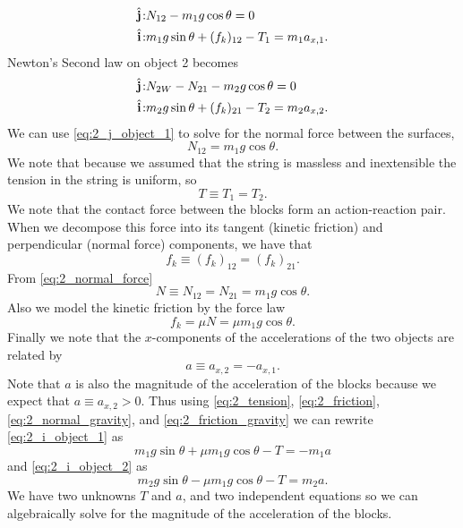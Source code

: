 \documentclass{esg8012exam}
\providecommand{\uvec}[1]{{\hat{\bf{#1}}}}
\begin{document}
\begin{solution}
  \begin{align}
    \uvec j\!: & N_{12} - m_1 g \cos\theta = 0 \label{eq:2_j_object_1} \\
    \uvec i\!: & m_1 g \sin\theta + (f_k)_{12} - T_1 = m_1 a_{x,1}. \label{eq:2_i_object_1}
  \end{align}
  Newton's Second law on object 2 becomes
  \begin{align}
    \uvec j\!: & N_{2W} - N_{21} - m_2 g \cos\theta = 0 \label{eq:2_j_object_2} \\
    \uvec i\!: & m_2 g \sin\theta + (f_k)_{21} - T_2 = m_2 a_{x,2}. \label{eq:2_i_object_2}
  \end{align}
  We can use \autoref{eq:2_j_object_1} to solve for the normal force between the surfaces,
  \begin{equation}
    N_{12} = m_1 g \cos\theta. \label{eq:2_normal_force}
  \end{equation}
  We note that because we assumed that the string is massless and inextensible the tension in the string is uniform, so
  \begin{equation}
    T \equiv T_1 = T_2. \label{eq:2_tension}
  \end{equation}
  We note that the contact force between the blocks form an action-reaction pair.  When we decompose this force into its tangent (kinetic friction) and perpendicular (normal force) components, we have that
  \begin{equation}
    f_k \equiv (f_k)_{12} = (f_k)_{21}. \label{eq:2_friction}
  \end{equation}
  From \autoref{eq:2_normal_force}
  \begin{equation}
    N \equiv N_{12} = N_{21} = m_1 g \cos\theta. \label{eq:2_normal_gravity}
  \end{equation}
  Also we model the kinetic friction by the force law
  \begin{equation}
    f_k = \mu N = \mu m_1 g \cos\theta. \label{eq:2_friction_gravity}
  \end{equation}
  Finally we note that the $x$-components of the accelerations of the two objects are related by
  \begin{equation}
    a \equiv a_{x,2} = -a_{x,1}. \label{eq:2_acceleration}
  \end{equation}
  Note that $a$ is also the magnitude of the acceleration of the blocks because we expect that $a \equiv a_{x, 2} > 0$. Thus using \autoref{eq:2_tension}, \autoref{eq:2_friction}, \autoref{eq:2_normal_gravity}, and \autoref{eq:2_friction_gravity} we can rewrite \autoref{eq:2_i_object_1} as
  \begin{equation}
    m_1 g \sin\theta + \mu m_1 g \cos\theta - T = -m_1 a \label{eq:2_rewrite_i_object_1}
  \end{equation}
  and \autoref{eq:2_i_object_2} as
  \begin{equation}
    m_2 g \sin\theta - \mu m_1 g \cos\theta - T = m_2 a. \label{eq:2_rewrite_i_object_2}
  \end{equation}
  We have two unknowns $T$ and $a$, and two independent equations so we can algebraically solve for the magnitude of the acceleration of the blocks.
  

\end{solution}
\end{document}
